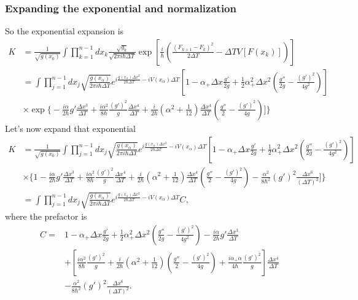 \subsubsection{Expanding the exponential and normalization}

So the exponential expansion is 
\begin{align}
K & = \frac{1}{\sqrt{g(x_0)}}\int \prod_{k=1}^{n-1} dx_k\frac{\sqrt{g_k}}{\sqrt{2\pi i \hbar \Delta T}} \exp\left[ \frac{i}{\hbar}\left(\frac{(F_{k+1}-F_{k})^2}{2\Delta T} -\Delta T V[F(x_k)]\right)\right]\\
& = \int \prod_{j=1}^{n-1} dx_j \sqrt{\frac{g(x_\alpha)}{2\pi i \hbar\Delta T}}   e^{i\frac{g(x_\alpha)\Delta x^2}{2\hbar\Delta T} -iV(x_\alpha)\Delta T}\left[1 -\alpha_+\Delta x\frac{g'}{2g} + \frac{1}{2}\alpha_+^2\Delta x^2\left(\frac{g''}{2g} - \frac{(g')^2}{4 g^{2}}\right)\right]\nonumber\\
&\times \exp\bigg\{ -\frac{i\alpha}{2\hbar}g'\frac{\Delta x^3}{\Delta T} + \frac{i\alpha^2}{8\hbar}\frac{(g')^2}{g}\frac{\Delta x^4}{\Delta T} +\frac{i}{2\hbar}\left(\alpha^2 + \frac{1}{12}\right)\frac{\Delta x^4}{\Delta T}\left(\frac{g''}{2}  - \frac{(g')^2}{4g}\right)\bigg]\bigg\}
\end{align}
Let's now expand that exponential 
\begin{align}%
K& = \frac{1}{\sqrt{g(x_0)}}\int \prod_{j=1}^{n-1} dx_j \sqrt{\frac{g(x_\alpha)}{2\pi i \hbar\Delta T}}   e^{i\frac{g(x_\alpha)\Delta x^2}{2\hbar\Delta T} -iV(x_\alpha)\Delta T}\left[1 -\alpha_+\Delta x\frac{g'}{2g} + \frac{1}{2}\alpha_+^2\Delta x^2\left(\frac{g''}{2g} - \frac{(g')^2}{4 g^{2}}\right)\right]\nonumber\\
&\times \bigg\{1 -\frac{i\alpha}{2\hbar}g'\frac{\Delta x^3}{\Delta T}  + \frac{i\alpha^2}{8\hbar}\frac{(g')^2}{g}\frac{\Delta x^4}{\Delta T}+\frac{i}{2\hbar}\left(\alpha^2 + \frac{1}{12}\right)\frac{\Delta x^4}{\Delta T}\left(\frac{g''}{2}  - \frac{(g')^2}{4g}\right) - \frac{\alpha^2}{8\hbar^2}(g')^2\frac{\Delta x^6}{(\Delta T)^2}\bigg]\bigg\}\\
& = \int \prod_{j=1}^{n-1} dx_j \sqrt{\frac{g(x_\alpha)}{2\pi i \hbar\Delta T}}   e^{i\frac{g(x_\alpha)\Delta x^2}{2\hbar\Delta T} -iV(x_\alpha)\Delta T} C,
\end{align}
where the prefactor is 
\begin{align}
C =&1 -\alpha_+\Delta x\frac{g'}{2g} + \frac{1}{2}\alpha_+^2\Delta x^2\left(\frac{g''}{2g} - \frac{(g')^2}{4 g^{2}}\right)-\frac{i\alpha}{2\hbar}g'\frac{\Delta x^3}{\Delta T}\nonumber\\
&   + \left[\frac{i\alpha^2}{8\hbar}\frac{(g')^2}{g}+\frac{i}{2\hbar}\left(\alpha^2 + \frac{1}{12}\right)\left(\frac{g''}{2}  - \frac{(g')^2}{4g}\right) +\frac{i\alpha_+\alpha}{4\hbar}\frac{(g')^2}{g}\right]\frac{\Delta x^4}{\Delta T} \nonumber\\
&- \frac{\alpha^2}{8\hbar^2}(g')^2\frac{\Delta x^6}{(\Delta T)^2}.
\end{align}


